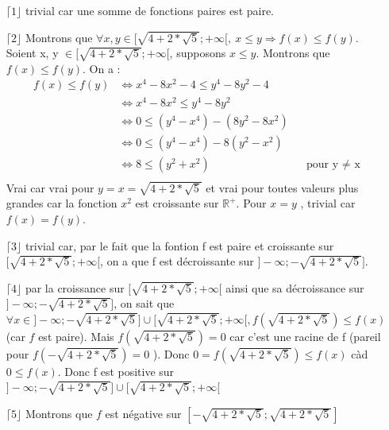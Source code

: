 \documentclass[a4paper, 12pt]{article}
\begin{document}
\begin{itemize}
	\item[\(\lceil 1 \rfloor\)] trivial car une somme de fonctions paires est paire.
	\item[\(\lceil 2 \rfloor\)] Montrons que \( \forall x, y \in [ \sqrt{4 + 2 * \sqrt{5}} ; +\infty [, ~ x \leq y \Rightarrow f(x) \leq f(y) \). \newline
	Soient x, y \( \in [ \sqrt{4 + 2 * \sqrt{5}} ; +\infty [ \), supposons \( x \leq y \). Montrons que \( f(x) \leq f(y) \). \newline On a :
	\begin{align*}
		f(x) \leq f(y) &\Leftrightarrow x^4 - 8x^2 - 4 \leq y^4 - 8y^2 - 4 \\
		&\Leftrightarrow x^4 - 8x^2 \leq y^4 - 8y^2 \\
		&\Leftrightarrow 0 \leq (y^4 - x^4) - (8y^2 - 8x^2) \\
		&\Leftrightarrow 0 \leq (y^4 - x^4) - 8(y^2 - x^2) \\
		&\Leftrightarrow 8 \leq (y^2 + x^2) &&\text{pour y $\neq$ x} \\
	\end{align*}
Vrai car vrai pour $ y = x = \sqrt{4+2*\sqrt{5}}$ et vrai pour toutes valeurs plus grandes car la fonction $x^2$ est croissante sur $\mathbb{R}^+$. Pour $x=y$ , trivial car $f(x)=f(y)$.
	\item[\(\lceil 3 \rfloor\)] trivial car, par le fait que la fontion f est paire et croissante sur \( [ \sqrt{4 + 2 * \sqrt{5}} ; +\infty [ \), on a que f est décroissante sur \( ] -\infty ; -\sqrt{4 + 2 * \sqrt{5}} ] \).
	\item[\(\lceil 4 \rfloor\)] par la croissance sur \( [ \sqrt{4 + 2 * \sqrt{5}} ; +\infty [ \) ainsi que sa décroissance sur \( ] -\infty ; -\sqrt{4 + 2 * \sqrt{5}} ] \), on sait que \( \forall x \in ] -\infty ; -\sqrt{4 + 2 * \sqrt{5}} ] \cup [ \sqrt{4 + 2 * \sqrt{5}} ; +\infty [, f \left( \sqrt{4 + 2 * \sqrt{5}}\right) \leq f \left( x \right) \) (car $f$ est paire). Mais \( f \left( \sqrt{4 + 2 * \sqrt{5}} \right) = 0 \) car c'est une racine de f (pareil pour \( f \left( - \sqrt{4 + 2 * \sqrt{5}} \right) = 0 \) ). \newline
	Donc \( 0 = f \left( \sqrt{4 + 2 * \sqrt{5}} \right) \leq f \left( x \right) \) càd \( 0 \leq f \left( x \right) \). Donc f est positive sur \( ] -\infty ; -\sqrt{4 + 2 * \sqrt{5}} ] \cup [ \sqrt{4 + 2 * \sqrt{5}} ; +\infty [ \)
	\item[\(\lceil 5 \rfloor\)] Montrons que $f$ est négative sur $ [ -\sqrt{4 + 2 * \sqrt{5}} ; \sqrt{4 + 2 * \sqrt{5}} ] $

\end{itemize}
\end{document}

